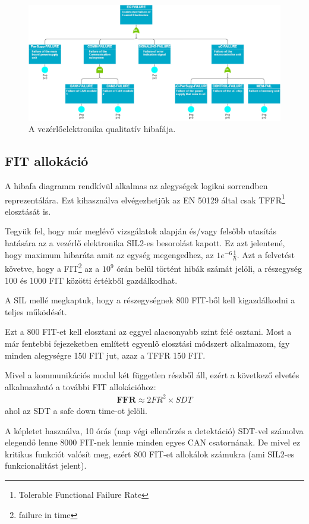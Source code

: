 \begin{figure}
    \footnotesize
    \centering
    \includegraphics[width=150mm, keepaspectratio]{figures/QualitativeFTA.png}
    \caption{A vezérlőelektronika qualitatív hibafája.}
    \label{fig:qualit}
\end{figure}

\subsection{FIT allokáció}
A hibafa diagramm rendkívül alkalmas az alegységek logikai sorrendben reprezentálára.
Ezt kihasználva elvégezhetjük az EN 50129\cite{EN50129} által csak TFFR\footnote{Tolerable Functional Failure Rate} elosztását is.

Tegyük fel, hogy már meglévő vizsgálatok alapján és/vagy felsőbb utasítás hatására az a vezérlő elektronika SIL2-es besorolást kapott.
Ez azt jelentené, hogy maximum hibaráta amit az egység megengedhez, az $1e^{-6} \frac{1}{h}$.
Azt a felvetést követve, hogy a FIT\footnote{failure in time} az a $10^{9}$ órán belül történt hibák számát jelöli, a részegység 100 és 1000 FIT közötti értékből gazdálkodhat.

A SIL mellé megkaptuk, hogy a részegységnek 800 FIT-ből kell kigazdálkodni a teljes működését.

Ezt a 800 FIT-et kell elosztani az eggyel alacsonyabb szint felé osztani.
Most a már fentebbi fejezeketben említett egyenlő elosztási módszert alkalmazom, így minden alegységre 150 FIT jut, azaz a TFFR 150 FIT.

Mivel a kommunikációs modul két független részből áll, ezért a következő elvetés alkalmazható a további FIT allokációhoz: 
\begin{align}
    \mathbf{FFR}\approx 2{FR}^{2}\times {SDT}
\end{align}
ahol az SDT a safe down time-ot jelöli.

A képletet használva, 10 órás (nap végi ellenőrzés a detektáció) SDT-vel számolva elegendő lenne 8000 FIT-nek lennie minden egyes CAN csatornának.
De mivel ez kritikus funkciót valósít meg, ezért 800 FIT-et allokálok számukra (ami SIL2-es funkcionalitást jelent).

